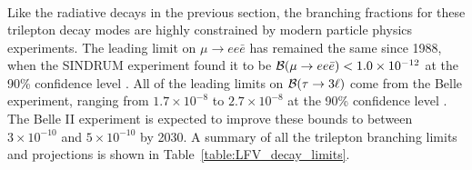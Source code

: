 {\begin{align}
\end{align}
Like the radiative decays in the previous section, the branching fractions for these trilepton decay modes are highly constrained by modern particle physics experiments. The leading limit on $\mu\rightarrow e e\bar{e}$ has remained the same since 1988, when the SINDRUM experiment found it to be ${\cal B}(\mu \rightarrow ee\bar{e}) < 1.0\times 10^{-12}$ at the 90\% confidence level \cite{SINDRUM:1987nra}. All of the leading limits on ${\cal B}(\tau \rightarrow 3\ell)$ come from the Belle experiment, ranging from $1.7\times 10^{-8}$ to $2.7\times 10^{-8}$ at the 90\% confidence level \cite{Hayasaka:2010np}. The Belle II experiment is expected to improve these bounds to between $3\times10^{-10}$ and $5\times10^{-10}$ by 2030.  A summary of all the trilepton branching limits and projections is shown in Table~\ref{table:LFV_decay_limits}.

}
